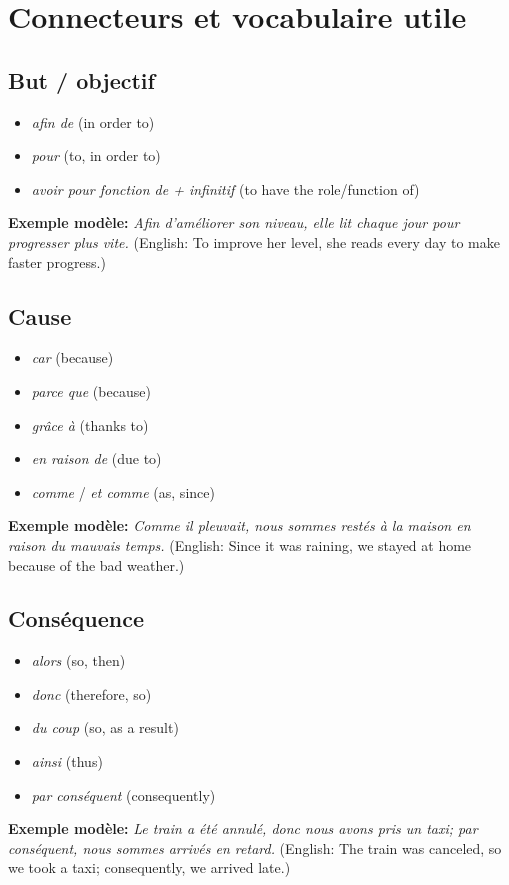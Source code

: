\documentclass{article}
\begin{document}
\section{Connecteurs et vocabulaire utile}

\subsection{But / objectif}
\begin{itemize}
    \item \textit{afin de} (in order to)
    \item \textit{pour} (to, in order to)
    \item \textit{avoir pour fonction de + infinitif} (to have the role/function of)
\end{itemize}
\textbf{Exemple modèle:} \textit{Afin d'améliorer son niveau, elle lit chaque jour pour progresser plus vite.} (English: To improve her level, she reads every day to make faster progress.)

\subsection{Cause}
\begin{itemize}
    \item \textit{car} (because)
    \item \textit{parce que} (because)
    \item \textit{grâce à} (thanks to)
    \item \textit{en raison de} (due to)
    \item \textit{comme} / \textit{et comme} (as, since)
\end{itemize}
\textbf{Exemple modèle:} \textit{Comme il pleuvait, nous sommes restés à la maison en raison du mauvais temps.} (English: Since it was raining, we stayed at home because of the bad weather.)

\subsection{Conséquence}
\begin{itemize}
    \item \textit{alors} (so, then)
    \item \textit{donc} (therefore, so)
    \item \textit{du coup} (so, as a result)
    \item \textit{ainsi} (thus)
    \item \textit{par conséquent} (consequently)
\end{itemize}
\textbf{Exemple modèle:} \textit{Le train a été annulé, donc nous avons pris un taxi; par conséquent, nous sommes arrivés en retard.} (English: The train was canceled, so we took a taxi; consequently, we arrived late.)
\end{document}
